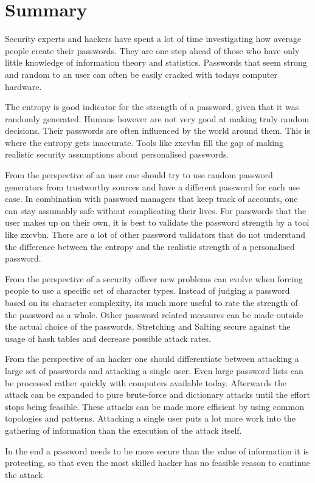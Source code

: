 \section{Summary}

Security experts and hackers have spent a lot of time investigating how average people create their passwords. They are one step ahead of those who have only little knowledge of information theory and statistics. Passwords that seem strong and random to an user can often be easily cracked with todays computer hardware.

The entropy is good indicator for the strength of a password, given that it was randomly generated. Humans however are not very good at making truly random decisions. Their passwords are often influenced by the world around them. This is where the entropy gets inaccurate. Tools like zxcvbn fill the gap of making realistic security assumptions about personalised passwords.

From the perspective of an user one should try to use random password generators from trustworthy sources and have a different password for each use case. In combination with password managers that keep track of accounts, one can stay assumably safe without complicating their lives. For passwords that the user makes up on their own, it is best to validate the password strength by a tool like zxcvbn. There are a lot of other password validators that do not understand the difference between the entropy and the realistic strength of a personalised password.

From the perspective of a security officer new problems can evolve when forcing people to use a specific set of character types. Instead of judging a password based on its character complexity, its much more useful to rate the strength of the password as a whole. Other password related measures can be made outside the actual choice of the passwords. Stretching and Salting secure against the usage of hash tables and decrease possible attack rates.

From the perspective of an hacker one should differentiate between attacking a large set of passwords and attacking a single user. Even large password lists can be processed rather quickly with computers available today. Afterwards the attack can be expanded to pure brute-force and dictionary attacks until the effort stops being feasible. These attacks can be made more efficient by using common topologies and patterns. Attacking a single user puts a lot more work into the gathering of information than the execution of the attack itself.

In the end a password needs to be more secure than the value of information it is protecting, so that even the most skilled hacker has no feasible reason to continue the attack.

\newpage